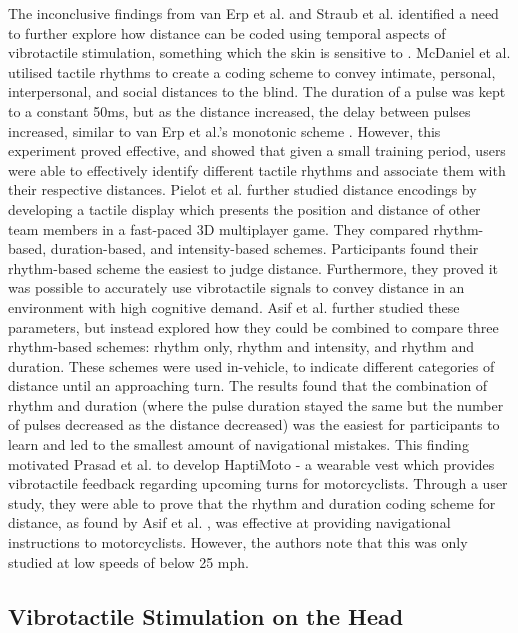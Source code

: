 \documentclass{interim}
\begin{document}
The inconclusive findings from van Erp et al. \cite{10.1145/1060581.1060585} and Straub et al. \cite{5326374} identified a need to further explore how distance can be coded using temporal aspects of vibrotactile stimulation, something which the skin is sensitive to \cite{doi:10.1068/p5014}. McDaniel et al. \cite{10.1145/1520340.1520718} utilised tactile rhythms to create a coding scheme to convey intimate, personal, interpersonal, and social distances to the blind. The duration of a pulse was kept to a constant 50ms, but as the distance increased, the delay between pulses increased, similar to van Erp et al.'s monotonic scheme \cite{10.1145/1060581.1060585}. However, this experiment proved effective, and showed that given a small training period, users were able to effectively identify different tactile rhythms and associate them with their respective distances. Pielot et al. \cite{10.1145/1753326.1753581} further studied distance encodings by developing a tactile display which presents the position and distance of other team members in a fast-paced 3D multiplayer game. They compared rhythm-based, duration-based, and intensity-based schemes. Participants found their rhythm-based scheme the easiest to judge distance. Furthermore, they proved it was possible to accurately use vibrotactile signals to convey distance in an environment with high cognitive demand. Asif et al. \cite{10.1145/1868914.1868923} further studied these parameters, but instead explored how they could be combined to compare three rhythm-based schemes: rhythm only, rhythm and intensity, and rhythm and duration. These schemes were used in-vehicle, to indicate different categories of distance until an approaching turn. The results found that the combination of rhythm and duration (where the pulse duration stayed the same but the number of pulses decreased as the distance decreased) was the easiest for participants to learn and led to the smallest amount of navigational mistakes. This finding motivated Prasad et al. \cite{10.1145/2556288.2557404} to develop HaptiMoto - a wearable vest which provides vibrotactile feedback regarding upcoming turns for motorcyclists. Through a user study, they were able to prove that the rhythm and duration coding scheme for distance, as found by Asif et al. \cite{10.1145/1868914.1868923}, was effective at providing navigational instructions to motorcyclists. However, the authors note that this was only studied at low speeds of below 25 mph.


\subsection{Vibrotactile Stimulation on the Head}
\end{document}
